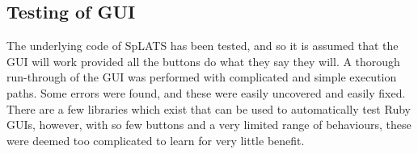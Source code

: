 \subsection{Testing of GUI}
The underlying code of SpLATS has been tested, and so it is assumed that the GUI will work provided all the buttons do what they say they will.
A thorough run-through of the GUI was performed with complicated and simple execution paths. Some errors were found, and these were easily uncovered and easily fixed.
There are a few libraries which exist that can be used to automatically test Ruby GUIs, however, with so few buttons and a very limited range of behaviours, these were deemed too complicated to learn for very little benefit.
